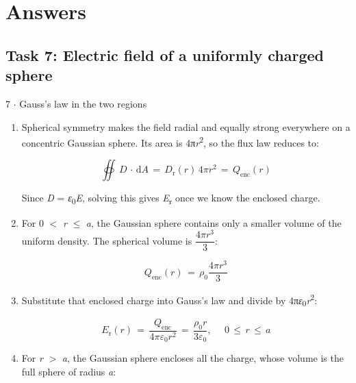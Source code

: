 \documentclass[11pt]{article}
\begin{document}
\clearpage
\section{Answers}
\begin{keepsection}\subsection{Task 7: Electric field of a uniformly charged sphere}

\begin{workedbox}{7 \ensuremath{\cdot} Gauss’s law in the two regions}
\begin{enumerate}
\item {}
Spherical symmetry makes the field radial and equally strong everywhere on a concentric Gaussian sphere. Its area is 4π\textit{r}\textsuperscript{2}, so the flux law reduces to:

\begin{equation*}\oiint \, {D}\, \cdot \, \mathrm{d}{A}\, =\, {D}_{\mathrm{r}}({r})\, 4π{r}^{2}\, =\, {Q}_{\text{enc}}({r})\end{equation*}

Since \textit{D} = \textit{ε}\textsubscript{0}\textit{E}, solving this gives \textit{E}\textsubscript{r} once we know the enclosed charge.
\item {}
For 0 \ensuremath{<} \textit{r} \ensuremath{\leq} \textit{a}, the Gaussian sphere contains only a smaller volume of the uniform density. The spherical volume is {\small\ensuremath{\dfrac{4π{r}^{3}}{3}}}:

\begin{equation*}{Q}_{\text{enc}}({r})\, =\, {ρ}_{0}\dfrac{4π{r}^{3}}{3}\end{equation*}
\item {}
Substitute that enclosed charge into Gauss’s law and divide by 4π\textit{ε}\textsubscript{0}\textit{r}\textsuperscript{2}:

\begin{equation*}{E}_{\mathrm{r}}({r})\, =\, \dfrac{{Q}_{\text{enc}}}{4π{ε}_{0}{r}^{2}}\, =\, \dfrac{{ρ}_{0}{r}}{3{ε}_{0}},\, \quad \, 0\, \leq \, {r}\, \leq \, {a}\end{equation*}
\item {}
For \textit{r} \ensuremath{>} \textit{a}, the Gaussian sphere encloses all the charge, whose volume is the full sphere of radius \textit{a}:


\end{enumerate}
\end{workedbox}
\end{keepsection}
\end{document}
